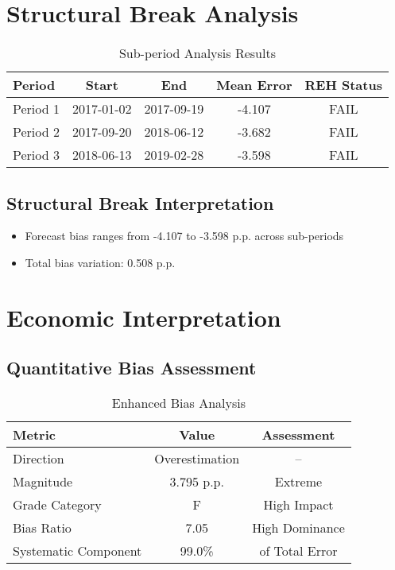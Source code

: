 \documentclass[11pt,a4paper]{article}
\begin{document}
\section{Structural Break Analysis}

\begin{table}[H]
\centering
\caption{Sub-period Analysis Results}
\begin{tabular}{lcccc}
\toprule
\textbf{Period} & \textbf{Start} & \textbf{End} & \textbf{Mean Error} & \textbf{REH Status} \\
\midrule
Period 1 & 2017-01-02 & 2017-09-19 & -4.107 & \textcolor{academicred}{FAIL} \\
Period 2 & 2017-09-20 & 2018-06-12 & -3.682 & \textcolor{academicred}{FAIL} \\
Period 3 & 2018-06-13 & 2019-02-28 & -3.598 & \textcolor{academicred}{FAIL} \\
\bottomrule
\end{tabular}
\end{table}

\subsection{Structural Break Interpretation}
\begin{itemize}
\item Forecast bias ranges from -4.107 to -3.598 p.p. across sub-periods
\item Total bias variation: 0.508 p.p.
\end{itemize}

\section{Economic Interpretation}

\subsection{Quantitative Bias Assessment}
\begin{table}[H]
  \centering
  \caption{Enhanced Bias Analysis}
  \begin{tabular}{lcc}
    \toprule
    \textbf{Metric}      & \textbf{Value} & \textbf{Assessment} \\
    \midrule
    Direction            & Overestimation & --                  \\
    Magnitude            & 3.795 p.p.     & Extreme             \\
    Grade Category       & F              & High Impact         \\
    Bias Ratio           & 7.05           & High Dominance      \\
    Systematic Component & 99.0\%         & of Total Error      \\
    \bottomrule
  \end{tabular}
\end{table}
\end{document}
